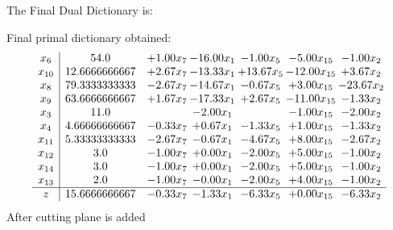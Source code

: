 \documentclass[8pt]{article}
\begin{document}
The Final Dual Dictionary is: 

 Final primal dictionary obtained: 
\[\begin{array}{c| c c@{\hskip 2pt} c@{\hskip 2pt} c@{\hskip 2pt} c@{\hskip 2pt} c@{\hskip 2pt} }
 x_{6}   &  54.0 & +  1.00 x_{7} & -16.00 x_{1} & -1.00 x_{5} & -5.00 x_{15} & -1.00 x_{2}\\
 x_{10}   &  12.6666666667 & +  2.67 x_{7} & -13.33 x_{1} & + 13.67 x_{5} & -12.00 x_{15} & +  3.67 x_{2}\\
 x_{8}   &  79.3333333333 & -2.67 x_{7} & -14.67 x_{1} & -0.67 x_{5} & +  3.00 x_{15} & -23.67 x_{2}\\
 x_{9}   &  63.6666666667 & +  1.67 x_{7} & -17.33 x_{1} & +  2.67 x_{5} & -11.00 x_{15} & -1.33 x_{2}\\
 x_{3}   &  11.0  &   & -2.00 x_{1} &   & -1.00 x_{15} & -2.00 x_{2}\\
 x_{4}   &  4.66666666667 & -0.33 x_{7} & +  0.67 x_{1} & -1.33 x_{5} & +  1.00 x_{15} & -1.33 x_{2}\\
 x_{11}   &  5.33333333333 & -2.67 x_{7} & -0.67 x_{1} & -4.67 x_{5} & +  8.00 x_{15} & -2.67 x_{2}\\
 x_{12}   &  3.0 & -1.00 x_{7} & +  0.00 x_{1} & -2.00 x_{5} & +  5.00 x_{15} & -1.00 x_{2}\\
 x_{14}   &  3.0 & -1.00 x_{7} & +  0.00 x_{1} & -2.00 x_{5} & +  5.00 x_{15} & -1.00 x_{2}\\
 x_{13}   &  2.0 & -1.00 x_{7} & -0.00 x_{1} & -2.00 x_{5} & +  4.00 x_{15} & -1.00 x_{2}\\
\hline
z    &  15.6666666667 & -0.33 x_{7} & -1.33 x_{1} & -6.33 x_{5} & +  0.00 x_{15} & -6.33 x_{2}\\
\end{array}\]
 After cutting plane is added 
\end{document}

